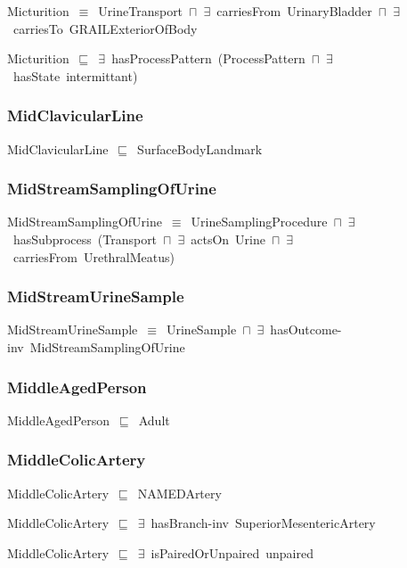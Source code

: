\documentclass{article}
\begin{document}
Micturition~\ensuremath{\equiv}~UrineTransport~\ensuremath{\sqcap}~\ensuremath{\exists}~carriesFrom~UrinaryBladder~\ensuremath{\sqcap}~\ensuremath{\exists}~carriesTo~GRAILExteriorOfBody

Micturition~\ensuremath{\sqsubseteq}~\ensuremath{\exists}~hasProcessPattern~(ProcessPattern~\ensuremath{\sqcap}~\ensuremath{\exists}~hasState~intermittant)~

\subsubsection*{MidClavicularLine}

MidClavicularLine~\ensuremath{\sqsubseteq}~SurfaceBodyLandmark~

\subsubsection*{MidStreamSamplingOfUrine}

MidStreamSamplingOfUrine~\ensuremath{\equiv}~UrineSamplingProcedure~\ensuremath{\sqcap}~\ensuremath{\exists}~hasSubprocess~(Transport~\ensuremath{\sqcap}~\ensuremath{\exists}~actsOn~Urine~\ensuremath{\sqcap}~\ensuremath{\exists}~carriesFrom~UrethralMeatus)

\subsubsection*{MidStreamUrineSample}

MidStreamUrineSample~\ensuremath{\equiv}~UrineSample~\ensuremath{\sqcap}~\ensuremath{\exists}~hasOutcome-inv~MidStreamSamplingOfUrine

\subsubsection*{MiddleAgedPerson}

MiddleAgedPerson~\ensuremath{\sqsubseteq}~Adult~

\subsubsection*{MiddleColicArtery}

MiddleColicArtery~\ensuremath{\sqsubseteq}~NAMEDArtery~

MiddleColicArtery~\ensuremath{\sqsubseteq}~\ensuremath{\exists}~hasBranch-inv~SuperiorMesentericArtery~

MiddleColicArtery~\ensuremath{\sqsubseteq}~\ensuremath{\exists}~isPairedOrUnpaired~unpaired~
\end{document}

